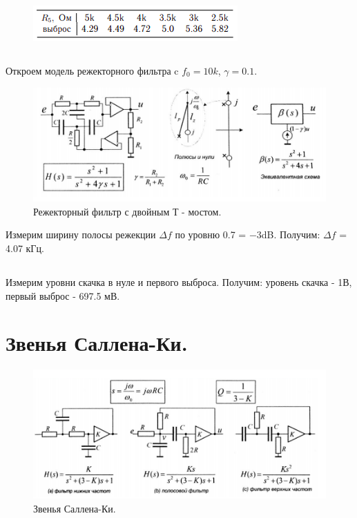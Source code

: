 \documentclass[15pt,a5paper,reqno]{article}
\begin{document}
\begin{figure}[h!]
    \centering
    \includegraphics[width=0.5\linewidth]{pics/pic8.png}
\end{figure}


\subsection{}

Откроем модель режекторного фильтра c $f_0 = 10k$, $\gamma = 0.1$.

\begin{figure}[h!]
    \centering
    \includegraphics[width=1\linewidth]{pics/pic9.png}
    \caption{Режекторный фильтр с двойным Т - мостом.}
\end{figure}

Измерим ширину полосы режекции $\Delta f$ по уровню 0.7 = −3dB. Получим: $\Delta f$ = 4.07 кГц.

\subsection{}


Измерим уровни скачка в нуле и первого выброса. Получим: уровень скачка - 1В, первый выброс - 697.5 мВ.

\newpage

\section{Звенья Саллена-Ки.}

\begin{figure}[h!]
    \centering
    \includegraphics[width=1\linewidth]{pics/pic10.png}
    \caption*{Звенья Саллена-Ки.}
\end{figure}
\end{document}

